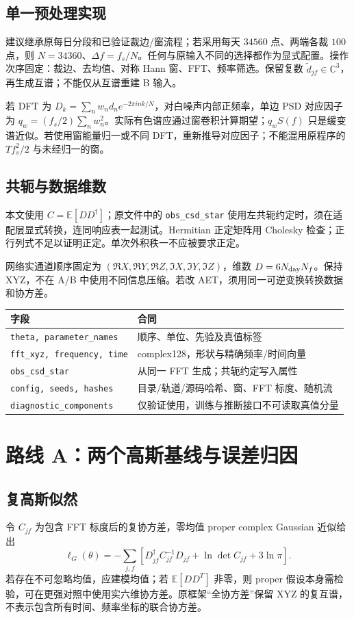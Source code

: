 \documentclass[UTF8,fontset=none,a4paper,11pt]{ctexart}
\newcommand{\E}{\mathbb E}\newcommand{\R}{\mathbb R}\newcommand{\tr}{\operatorname{tr}}
\newcommand{\chapterpage}[1]{\section{#1}}
\begin{document}
\subsection{单一预处理实现}
建议继承原每日分段和已验证裁边/窗流程；若采用每天 $34560$ 点、两端各裁 $100$ 点，则 $N=34360$、$\Delta f=f_s/N$。任何与原输入不同的选择都作为显式配置。操作次序固定：裁边、去均值、对称 Hann 窗、FFT、频率筛选。保留复数 $\tilde d_{jf}\in\mathbb C^3$，再生成互谱；不能仅从互谱重建 B 输入。
\par 若 DFT 为 $D_k=\sum_n w_n d_n e^{-2\pi i nk/N}$，对白噪声内部正频率，单边 PSD 对应因子为 $q_w=(f_s/2)\sum_n w_n^2$。实际有色谱应通过窗卷积计算期望；$q_w S(f)$ 只是缓变谱近似。若使用窗能量归一或不同 DFT，重新推导对应因子；不能混用原程序的 $Tf_s^2/2$ 与未经归一的窗。
\subsection{共轭与数据维数}
本文使用 $C=\E[DD^\dagger]$；原文件中的 \texttt{obs\_csd\_star} 使用左共轭约定时，须在适配层显式转换，连同响应表一起测试。Hermitian 正定矩阵用 Cholesky 检查；正行列式不足以证明正定。单次外积秩一不应被要求正定。
\par 网络实通道顺序固定为 $(\Re X,\Re Y,\Re Z,\Im X,\Im Y,\Im Z)$，维数 $D=6N_{\rm day}N_f$。保持 XYZ，不在 A/B 中使用不同信息压缩。若改 AET，须用同一可逆变换转换数据和协方差。
\par\noindent
\begin{tabularx}{\linewidth}{p{44mm}Y}\toprule
字段 & 合同\\\midrule
\texttt{theta, parameter\_names} & 顺序、单位、先验及真值标签\\
\texttt{fft\_xyz, frequency, time} & complex128，形状与精确频率/时间向量\\
\texttt{obs\_csd\_star} & 从同一 FFT 生成；共轭约定写入属性\\
\texttt{config, seeds, hashes} & 目录/轨道/源码哈希、窗、FFT 标度、随机流\\
\texttt{diagnostic\_components} & 仅验证使用，训练与推断接口不可读取真值分量\\\bottomrule
\end{tabularx}
\chapterpage{路线 A：两个高斯基线与误差归因}
\subsection{复高斯似然}
令 $C_{jf}$ 为包含 FFT 标度后的复协方差，零均值 proper complex Gaussian 近似给出
\begin{equation}
\ell_G(\theta)=-\sum_{j,f}\left[D_{jf}^{\dagger}C_{jf}^{-1}D_{jf}+\ln\det C_{jf}+3\ln\pi\right].
\end{equation}
若存在不可忽略均值，应建模均值；若 $\E[DD^T]$ 非零，则 proper 假设本身需检验，可在更强对照中使用实六维协方差。原框架“全协方差”保留 XYZ 的复互谱，不表示包含所有时间、频率坐标的联合协方差。
\end{document}
